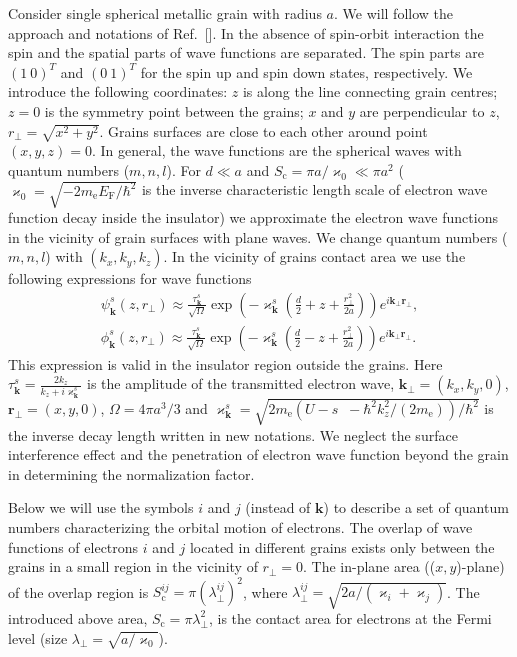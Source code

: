 \documentclass[aps,prb,amsmath,amssymb,twocolumn,superscriptaddress,showpacs,floatfix]{revtex4-1}
\DeclareMathOperator{\Ji}{\mathit J_{\mathrm{sd}}}
\begin{document}
Consider single spherical metallic grain with radius $a$. We will follow the approach and notations of Ref.~[]. In the absence of spin-orbit interaction the spin and the spatial parts
of wave functions are separated. The spin parts are $(1~0)^T$ and $(0~1)^T$
for the spin up and spin down states, respectively. We introduce the following coordinates: $z$ is along the line connecting grain centres;
$z=0$ is the symmetry point between the grains; $x$ and $y$ are perpendicular to $z$, $r_\perp=\sqrt{x^2+y^2}$. Grains surfaces are close to each other around point $(x,y,z)=0$. In general, the wave functions are the spherical waves with quantum numbers ($m,n,l$). For $d \ll a$ and $S_\mathrm c=\pi a/\varkappa_0 \ll \pi a^2$ ($\varkappa_0=\sqrt{-2m_\mathrm eE_\mathrm F/\hbar^2}$ is the inverse characteristic length scale of electron wave function decay inside the insulator) we approximate the electron wave functions in the vicinity of grain surfaces with plane waves. We change quantum numbers ($m,n,l$) with $(k_x,k_y,k_z)$. In the vicinity of grains contact area we use the following expressions for wave functions
\begin{equation}\label{Eq:WaveFuncR5}
\begin{split}
\psi_\mathbf k^s(z,r_\perp)\approx\frac{\tau_\mathbf k^s}{\sqrt{\Omega}}\exp\left(-\varkappa_\mathbf k^s\left(\frac{d}{2}+ z+\frac{r_\perp^2}{2a}\right)\right)e^{i\mathbf k_\perp \mathbf r_\perp},\\
\phi_\mathbf k^s(z,r_\perp)\approx\frac{\tau^s_\mathbf k}{\sqrt{\Omega}}\exp\left(-\varkappa_\mathbf k^s\left(\frac{d}{2}
- z+\frac{r_\perp^2}{2a}\right)\right)e^{i\mathbf k_\perp \mathbf r_\perp}.
\end{split}
\end{equation}
This expression is valid in the insulator region outside the grains. Here $\tau_\mathbf k^s =\frac{2k_z}{k_z+i\varkappa^s_\mathbf k}$ is the amplitude of the transmitted electron wave,
$\mathbf k_{\perp}=(k_x,k_y,0)$, $\mathbf r_{\perp}=(x,y,0)$, $\Omega=4\pi a^3/3$ and
$\varkappa^s_\mathbf k=\sqrt{2m_\mathrm e(U-s\Ji-\hbar^2k^2_z/(2m_\mathrm e))/\hbar^2}$
is the inverse decay length written in new notations. We neglect
the surface interference effect and the penetration of electron wave function beyond the
grain in determining the normalization factor.

Below we will use the symbols $i$ and $j$ (instead of $\mathbf k$) to describe a set of quantum numbers characterizing the
orbital motion of electrons. The overlap of wave functions of electrons $i$ and $j$ located in different grains
exists only between the grains in a small region in the vicinity of $r_\perp=0$.
The in-plane area (($x,y$)-plane) of the overlap region is $S^{ij}_\mathrm c=\pi (\lambda^{ij}_\perp)^2$, where $\lambda^{ij}_\perp=\sqrt{2a/(\varkappa_i+\varkappa_j)}$. The introduced above area,
$S_\mathrm c=\pi\lambda^2_\perp$, is the contact area for electrons at the Fermi level (size $\lambda_\perp=\sqrt{a/\varkappa_0}$).
\end{document}
